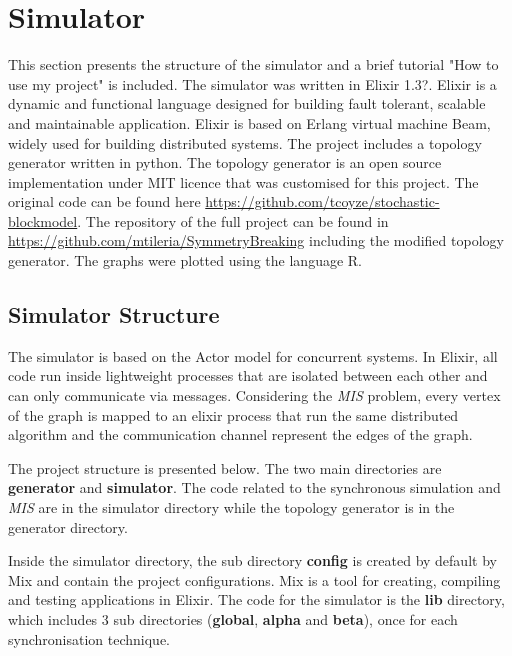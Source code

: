 \section{Simulator}
\label{chap:4}

This section presents the structure of the simulator and a brief tutorial "How to use my project" is included. The simulator was written in Elixir 1.3?. Elixir is a dynamic and functional language designed for building fault tolerant, scalable and maintainable application. Elixir is based on Erlang virtual machine Beam, widely used for building distributed systems. The project includes a topology generator written in python. The topology generator is an open source implementation under MIT licence that was customised for this project. The original code can be found here \url{https://github.com/tcoyze/stochastic-blockmodel}. The repository of the full project can be found in \url{https://github.com/mtileria/SymmetryBreaking} including the modified topology generator. The graphs were plotted using the language R. 



\subsection{Simulator Structure}

The simulator is based on the Actor model for concurrent systems. In Elixir, all code run inside lightweight processes that are isolated between each other and can only communicate via messages. Considering the \textit{MIS} problem, every vertex of the graph is mapped to an elixir process that run the same distributed algorithm and the communication channel represent the edges of the graph.  

The project structure is presented below. The two main directories are \textbf{generator} and \textbf{simulator}. The code related to the synchronous simulation and \textit{MIS} are in the simulator directory while the topology generator is in the generator directory. 


Inside the simulator directory, the sub directory \textbf{config} is created by default by Mix and contain the project configurations. Mix is a tool for creating, compiling and testing applications in Elixir. The code for the simulator is the \textbf{lib} directory, which includes 3 sub directories (\textbf{global}, \textbf{alpha} and \textbf{beta}), once for each synchronisation technique. 




